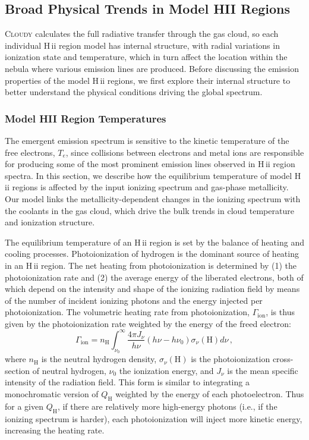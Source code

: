 \documentclass[linenumbers, tighten, trackchanges]{aastex61}%
\newcommand{\Cloudy}{\textsc{Cloudy}\xspace}
\newcommand{\Te}{\ensuremath{T_{e}}}
\newcommand{\hii}{H\,{\sc ii}\xspace}
\newcommand{\nH}{\ensuremath{n_{\mathrm{H}}}}
\newcommand{\QH}{\ensuremath{Q_{\mathrm{H}}}}
\newcommand{\Heat}{\ensuremath{\Gamma_{\mathrm{ion}}}}
\begin{document}
\subsection{Broad Physical Trends in Model HII Regions}\label{sec:models:broad}

\Cloudy calculates the full radiative transfer through the gas cloud, so each individual \hii region model has internal structure, with radial variations in ionization state and temperature, which in turn affect the location within the nebula where various emission lines are produced. Before discussing the emission properties of the model \hii regions, we first explore their internal structure to better understand the physical conditions driving the global spectrum.

\subsubsection{Model HII Region Temperatures}\label{sec:models:broad:temp}

The emergent emission spectrum is sensitive to the kinetic temperature of the free electrons, \Te{}, since collisions between electrons and metal ions are responsible for producing some of the most prominent emission lines observed in \hii region spectra. In this section, we describe how the equilibrium temperature of model \hii regions is affected by the input ionizing spectrum and gas-phase metallicity. Our model links the metallicity-dependent changes in the ionizing spectrum with the coolants in the gas cloud, which drive the bulk trends in cloud temperature and ionization structure.

The equilibrium temperature of an \hii region is set by the balance of heating and cooling processes. Photoionization of hydrogen is the dominant source of heating in an \hii region. The net heating from photoionization is determined by (1) the photoionization rate and (2) the average energy of the liberated electrons, both of which depend on the intensity and shape of the ionizing radiation field by means of the number of incident ionizing photons and the energy injected per photoionization. The volumetric heating rate from photoionization, \Heat{}, is thus given by the photoionization rate weighted by the energy of the freed electron:
\begin{equation}\label{eq:heat}
    \Gamma_{\mathrm{ion}} = \nH{} \int_{\nu_0}^{\infty} \frac{4 \pi J_{\nu}}{h\nu} (h \nu - h \nu_0) \sigma_{\nu}(\mathrm{H}) d\nu \,,
\end{equation}
where \nH{} is the neutral hydrogen density, $\sigma_{\nu}(\mathrm{H})$ is the photoionization cross-section of neutral hydrogen, $\nu_0$ the ionization energy,  and $J_{\nu}$ is the mean specific intensity of the radiation field. This form is similar to integrating a monochromatic version of \QH{} weighted by the energy of each photoelectron. Thus for a given \QH{}, if there are relatively more high-energy photons (i.e., if the ionizing spectrum is harder), each photoionization will inject more kinetic energy, increasing the heating rate.
\end{document}
